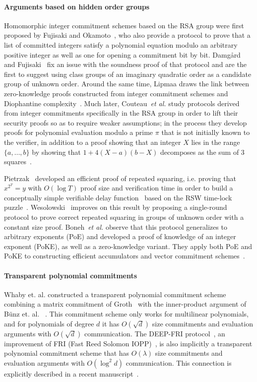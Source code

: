 \paragraph{Arguments based on hidden order groups} 
Homomorphic integer commitment schemes based on the RSA group were first proposed by Fujisaki and Okamoto~\cite{C:FujOka97}, who also provide a protocol to prove that a list of committed integers satisfy a polynomial equation modulo an arbitrary positive integer as well as one for opening a commitment bit by bit. Damgård and Fujisaki~\cite{AC:DamFuj02} fix an issue with the soundness proof of that protocol and are the first to suggest using class groups of an imaginary quadratic order as a candidate group of unknown order. Around the same time, Lipmaa draws the link between zero-knowledge proofs constructed from integer commitment schemes and Diophantine complexity~\cite{AC:Lipmaa03b}. Much later, Couteau~\emph{et al.} study protocols derived from integer commitments specifically in the RSA group in order to lift their security proofs so as to require weaker assumptions; in the process they develop proofs for polynomial evaluation modulo a prime $\pi$ that is not initially known to the verifier, in addition to a proof showing that an integer $X$ lies in the range $\{a, \ldots, b\}$ by showing that $1+4(X-a)(b-X)$ decomposes as the sum of 3 squares~\cite{EC:CouPetPoi17}.

Pietrzak~\cite{ITCS:Pietrzak18} developed an efficient proof of repeated squaring, i.e. proving that $x^{2^T} = y$ with $O(\log T)$ proof size and verification time in order to build a conceptually simple verifiable delay function~\cite{C:BBBF18} based on the RSW time-lock puzzle~\cite{RivShaWag96}. Wesolowski~\cite{EC:Wesolowski19} improves on this result by proposing a single-round protocol to prove correct repeated squaring in groups of unknown order with a constant size proof. Boneh~\emph{et al.} observe that this protocol generalizes to arbitrary exponents (PoE) and developed a proof of knowledge of an integer exponent (PoKE), as well as a zero-knowledge variant. They apply both PoE and PoKE to constructing efficient accumulators and vector commitment schemes~\cite{C:BonBunFis19}.

\paragraph{Transparent polynomial commitments} 
Whaby et. al. constructed a transparent polynomial commitment scheme combining a matrix commitment of Groth~\cite{C:Gro09} with the inner-product argument of B\"{u}nz et. al. ~\cite{SP:}. This commitment scheme only works for multilinear polynomials, and for polynomials of degree $d$ it has $O(\sqrt{d})$ size commitments and evaluation arguments with $O(\sqrt{d})$ communication. The DEEP-FRI protocol~\cite{ECCC:BGKS19}, an improvement of FRI (Fast Reed Solomon IOPP)~\cite{ICALP:BBHR18}, is also implicitly a transparent polynomial commitment scheme that has $O(\lambda)$ size commitments and evaluation arguments with $O(\log ^2 d)$ communication. This connection is explicitly described in a recent manuscript~\cite{MatterLabs}. 

